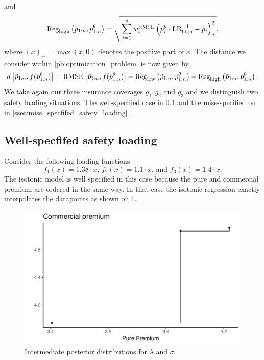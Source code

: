\documentclass[10pt]{article}
\begin{document}
and 
\begin{equation*}\label{eq:LR_bounds2}
\text{Reg}_{\text{high}}\left(\Tilde{p}_{1:n}, p_{1:n}^\theta\right) = \sqrt{\sum_{i=1}^nw_i^{\text{RMSE}}\left(p_i^\theta \cdot \text{LR}_{\text{high}}^{-1} - \Tilde{p}_i\right)_+^2},
\end{equation*}
where \((x)_+ = \max(x,0)\) denotes the positive part of \(x\). The distance we consider within \cref{pb:optimization_problem} is now given by 
\[
d\left[\Tilde{p}_{1:n}, f(p_{1:n}^\theta)\right] = \text{RMSE}\left[\Tilde{p}_{1:n}, f(p_{1:n}^\theta)\right] + \text{Reg}_{\text{low}}\left(\Tilde{p}_{1:n}, p_{1:n}^\theta\right) + \text{Reg}_{\text{high}}\left(\Tilde{p}_{1:n}, p_{1:n}^\theta\right).
\]
We take again our three insurance coverages $g_1, g_2$ and $g_3$ and we distinguish two safety loading situations. The well-specified case in \cref{ssec:well_specfifed_safety_loading} and the miss-specified on in \cref{ssec:miss_specfifed_safety_loading}
\subsection{Well-specfifed safety loading}\label{ssec:well_specfifed_safety_loading}
Consider the following loading functions
$$
f_1(x) = 1.38\cdot x\text{, }f_2(x) = 1.1\cdot x \text{, and } f_3(x) = 1.4\cdot x. 
$$
The isotonic model is well specified in this case because the pure and commercial premium are ordered in the same way. In that case the isotonic regression exactly interpolates the datapoints as shown on \cref{fig:pp_cp_well_specified}.

\begin{figure}[!ht]
  \begin{center}
  \includegraphics[width=0.7\linewidth]{../figures/pp_cp_well_specified}
    \caption{Intermediate posterior distributions for $\lambda$ and $\sigma$.}
    \label{fig:pp_cp_well_specified}
  \end{center}
\end{figure}
\end{document}
